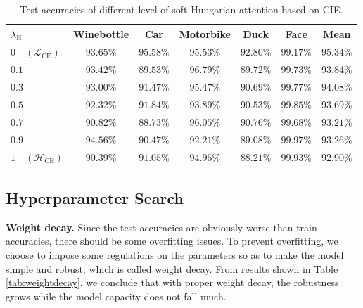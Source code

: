\documentclass[a4paper]{article}
\begin{document}
\begin{table}[htbp]
    \centering
    \begin{tabular}{lcccccc}
        \toprule
        $\lambda_{\mathrm{H}}$& Winebottle& Car& Motorbike& Duck& Face& Mean\\
        \midrule
        $0\quad (\mathcal{L}_{\mathrm{CE}})$&$93.65\%$& $\mathbf{95.58\%}$& $95.53\%$& $\mathbf{92.80\%}$& $99.17\%$& $\mathbf{95.34\%}$\\
        $0.1$& $93.42\%$& $89.53\%$& $96.79\%$& $89.72\%$& $99.73\%$& $93.84\%$\\
        $0.3$& $93.00\%$& $91.47\%$& $95.47\%$& $90.69\%$& $99.77\%$& $94.08\%$\\
        $0.5$& $92.32\%$& $91.84\%$& $93.89\%$& $90.53\%$& $99.85\%$& $93.69\%$\\
        $0.7$& $90.82\%$& $88.73\%$& $\mathbf{96.05\%}$& $90.76\%$& $99.68\%$& $93.21\%$\\
        $0.9$& $\mathbf{94.56\%}$& $90.47\%$& $92.21\%$& $89.08\%$& $\mathbf{99.97\%}$& $93.26\%$\\
        $1\quad (\mathcal{H}_{\mathrm{CE}})$& $90.39\%$& $91.05\%$& $94.95\%$& $88.21\%$& $99.93\%$& $92.90\%$\\
        \bottomrule
        
    \end{tabular}
    \caption{Test accuracies of different level of soft Hungarian attention based on CIE.}
    \label{tab:hungarian}
\end{table}

\subsection{Hyperparameter Search}
\textbf{Weight decay.}
Since the test accuracies are obviously worse than train accuracies, there should be some overfitting issues. To prevent overfitting, we choose to impose some regulations on the parameters so as to make the model simple and robust, which is called weight decay. From results shown in Table \ref{tab:weightdecay}, we conclude that with proper weight decay, the robustness grows while the model capacity does not fall much.
\end{document}
